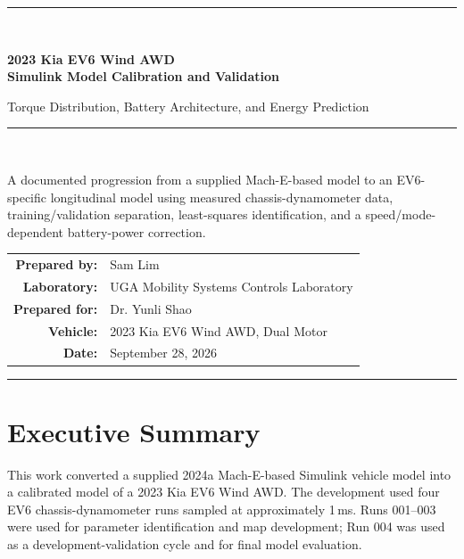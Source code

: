\documentclass[11pt,letterpaper]{article}
\newcommand{\SI}[2]{#1\,#2}
\begin{document}
\hypersetup{pageanchor=false}

\begin{titlepage}
  \centering
  \vspace*{0.65in}
  {\color{ev6navy}\rule{\textwidth}{2.2pt}}\\[0.35in]
  {\Huge\bfseries 2023 Kia EV6 Wind AWD\\[0.12in]
  Simulink Model Calibration and Validation\par}
  \vspace{0.28in}
  {\Large Torque Distribution, Battery Architecture, and Energy Prediction\par}
  \vspace{0.32in}
  {\color{ev6navy}\rule{0.72\textwidth}{0.8pt}}\\[0.42in]

  \begin{keybox}[width=0.86\textwidth]
  \centering
  A documented progression from a supplied Mach-E-based model to an
  EV6-specific longitudinal model using measured chassis-dynamometer data,
  training/validation separation, least-squares identification, and a
  speed/mode-dependent battery-power correction.
  \end{keybox}

  \vfill
  \begin{tabular}{rl}
    \textbf{Prepared by:} & Sam Lim \\
    \textbf{Laboratory:} & UGA Mobility Systems Controls Laboratory \\
    \textbf{Prepared for:} & Dr. Yunli Shao \\
    \textbf{Vehicle:} & 2023 Kia EV6 Wind AWD, Dual Motor \\
    \textbf{Date:} & September 28, 2026
  \end{tabular}
  \vfill
  {\color{ev6navy}\rule{\textwidth}{2.2pt}}
\end{titlepage}

\hypersetup{pageanchor=true}

\tableofcontents
\clearpage
{}

\section{Executive Summary}

This work converted a supplied 2024a Mach-E-based Simulink vehicle model into a
calibrated model of a 2023 Kia EV6 Wind AWD. The development used four EV6
chassis-dynamometer runs sampled at approximately \SI{1}{ms}. Runs 001--003
were used for parameter identification and map development; Run 004 was used as
a development-validation cycle and for final model evaluation.
\end{document}
